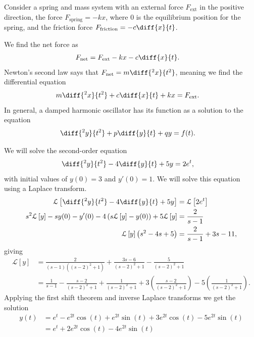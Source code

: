 \documentclass[10pt]{mypackage}
\begin{document}
\begin{example}
  Consider a spring and mass system with an external force $F_{\text{ext}}$ in the positive direction, the force $F_{\text{spring}} = -kx$, where $0$ is the equilibrium position for the spring, and the friction force $F_{\text{friction}} = -c\diff{x}{t}$.\newline

  We find the net force as
  \begin{align*}
    F_{\text{net}} &= F_{\text{ext}} - kx - c\diff{x}{t}.
  \end{align*}
  Newton's second law says that $F_\text{net} = m \diff{^2x}{t^2}$, meaning we find the differential equation
  \begin{align*}
    m \diff{^2x}{t^2} + c \diff{x}{t} + kx &= F_{\text{ext}}.
  \end{align*}
  In general, a damped harmonic oscillator has its function as a solution to the equation
  \begin{align*}
    \diff{^2y}{t^2} + p\diff{y}{t} + qy &= f(t).
  \end{align*}
\end{example}
\begin{example}
  We will solve the second-order equation
  \begin{align*}
    \diff{^2y}{t^2} - 4\diff{y}{t} + 5y &= 2e^{t},
  \end{align*}
  with initial values of $y(0) = 3$ and $y'(0) = 1$. We will solve this equation using a Laplace transform.
  \begin{align*} 
    \mathcal{L}\left[\diff{^2y}{t^2} - 4\diff{y}{t} + 5y\right] &= \mathcal{L}\left[2e^{t}\right]\\
    s^2\mathcal{L}\left[y\right] - sy(0) - y'(0) - 4\left(s\mathcal{L}\left[y\right] - y(0)\right) + 5\mathcal{L}\left[y\right] &= \frac{2}{s-1}\\
    \mathcal{L}\left[y\right]\left(s^2 - 4s + 5\right) &= \frac{2}{s-1} + 3s - 11,
  \end{align*}
  giving
  \begin{align*}
    \mathcal{L}\left[y\right] &= \frac{2}{\left(s-1\right)\left(\left(s-2\right)^2 + 1\right)} + \frac{3s - 6}{\left(s-2\right)^2 + 1} - \frac{5}{\left(s-2\right)^2 + 1}\\
                              &= \frac{1}{s-1} - \frac{s-2}{\left(s-2\right)^2 + 1} + \frac{1}{\left(s-2\right)^2 + 1} + 3\left(\frac{s-2}{\left(s-2\right)^2 + 1}\right) - 5\left(\frac{1}{\left(s-2\right)^2 + 1}\right).
  \end{align*}
  Applying the first shift theorem and inverse Laplace transforms we get the solution
  \begin{align*}
    y(t) &= e^{t} - e^{2t}\cos\left(t\right) + e^{2t}\sin\left(t\right) + 3e^{2t}\cos\left(t\right) - 5e^{2t}\sin\left(t\right)\\
         &= e^{t} + 2e^{2t}\cos\left(t\right) - 4e^{2t}\sin\left(t\right)
  \end{align*}
  
\end{example}
\end{document}
